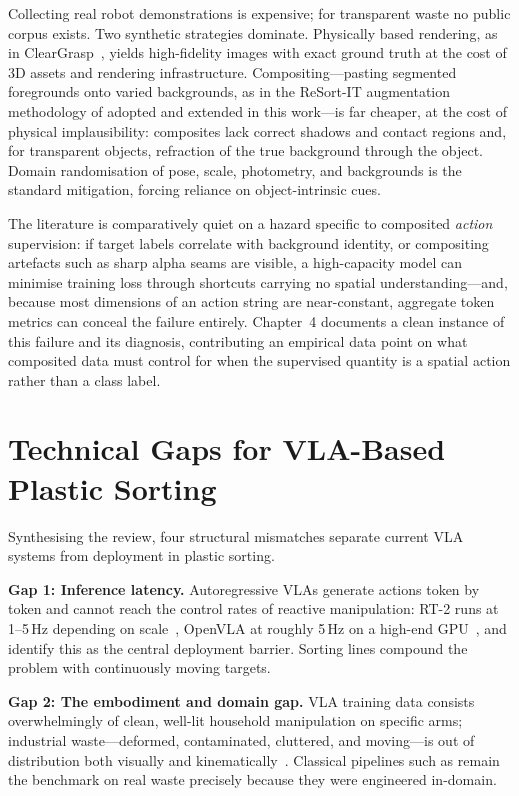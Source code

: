 Collecting real robot demonstrations is expensive; for transparent waste no public corpus exists. Two synthetic strategies dominate. Physically based rendering, as in ClearGrasp~\citep{sajjan2020}, yields high-fidelity images with exact ground truth at the cost of 3D assets and rendering infrastructure. Compositing---pasting segmented foregrounds onto varied backgrounds, as in the ReSort-IT augmentation methodology of \citet{koskinopoulou2021} adopted and extended in this work---is far cheaper, at the cost of physical implausibility: composites lack correct shadows and contact regions and, for transparent objects, refraction of the true background through the object. Domain randomisation of pose, scale, photometry, and backgrounds is the standard mitigation, forcing reliance on object-intrinsic cues.

The literature is comparatively quiet on a hazard specific to composited \emph{action} supervision: if target labels correlate with background identity, or compositing artefacts such as sharp alpha seams are visible, a high-capacity model can minimise training loss through shortcuts carrying no spatial understanding---and, because most dimensions of an action string are near-constant, aggregate token metrics can conceal the failure entirely. Chapter~4 documents a clean instance of this failure and its diagnosis, contributing an empirical data point on what composited data must control for when the supervised quantity is a spatial action rather than a class label.

\section{Technical Gaps for VLA-Based Plastic Sorting}
\label{sec:lit_gaps}

Synthesising the review, four structural mismatches separate current VLA systems from deployment in plastic sorting.

\textbf{Gap 1: Inference latency.} Autoregressive VLAs generate actions token by token and cannot reach the control rates of reactive manipulation: RT-2 runs at 1--5\,Hz depending on scale~\citep{zitkovich2023}, OpenVLA at roughly 5\,Hz on a high-end GPU~\citep{kim2024}, and \citet{kawaharazuka2025} identify this as the central deployment barrier. Sorting lines compound the problem with continuously moving targets.

\textbf{Gap 2: The embodiment and domain gap.} VLA training data consists overwhelmingly of clean, well-lit household manipulation on specific arms; industrial waste---deformed, contaminated, cluttered, and moving---is out of distribution both visually and kinematically~\citep{kawaharazuka2025}. Classical pipelines such as \citet{koskinopoulou2021} remain the benchmark on real waste precisely because they were engineered in-domain.

